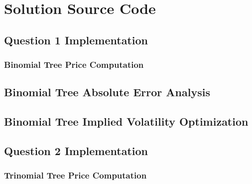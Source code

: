 \documentclass[10pt]{article}
\begin{document}

\newpage
\section{Solution Source Code}

    \subsection{Question 1 Implementation} \label{appendix:source:q1}

        \subsubsection{Binomial Tree Price Computation} \label{appendix:source:q1:prices}

            
        
        \subsection{Binomial Tree Absolute Error Analysis} \label{appendix:source:q1:abs_error}

            
        
        \subsection{Binomial Tree Implied Volatility Optimization} \label{appendix:source:q1:imp_vol}

            

    \newpage
    \subsection{Question 2 Implementation} \label{appendix:source:q2}

        \subsubsection{Trinomial Tree Price Computation} \label{appendix:source:q2:prices}
\end{document}
